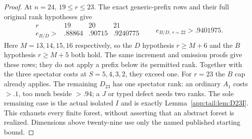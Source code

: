 \documentclass[11pt]{article}
\theoremstyle{definition}
\theoremstyle{remark}
\begin{document}
\begin{proof}
At $n=24$, $19\le r\le23$. The exact generic-prefix rows and
their full original rank hypotheses give
\[
\begin{array}{c|c|c|c}
r&19&20&21\\ \hline
e_{B/D}>&.88864&.90715&.9240775
\end{array}
\qquad e_{B/D,\,r=22}>.9401975.
\]
Here $M=13,14,15,16$ respectively, so the $D$ hypothesis
$r\ge M+6$ and the $B$ hypothesis $r\ge M+5$ both hold.
The same increment and omission proofs give these rows; they do
not apply a prefix below its permitted rank. Together with the
three spectator costs at $S=5,4,3,2$, they exceed one.
For $r=23$ the $B$ cap already applies. The remaining $D_{23}$
has one spectator rank: an ordinary $A_1$ costs $>.1$, too much
beside $>.94$; a $J$ or typed defect needs two ranks. The sole
remaining case is the actual isolated $I$ and is exactly
Lemma~\ref{app:tail:lem:D23I}. This exhausts every finite forest,
without asserting that an abstract forest is realized. Dimensions
above twenty-nine use only the named published starting bound.
\end{proof}
\end{document}
